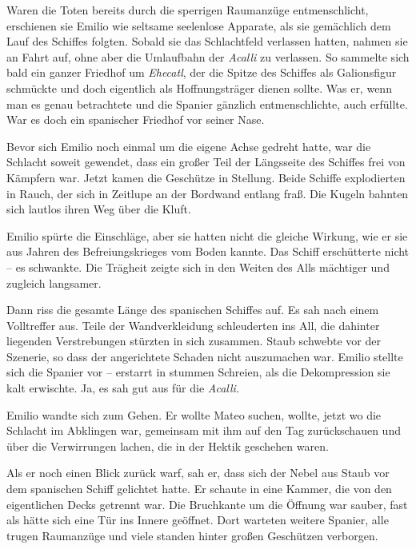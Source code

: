 Waren die Toten bereits durch die sperrigen Raumanzüge
entmenschlicht, erschienen sie Emilio wie seltsame seelenlose
Apparate, als sie gemächlich dem Lauf des Schiffes folgten. Sobald
sie das Schlachtfeld verlassen hatten, nahmen sie an Fahrt auf,
ohne aber die Umlaufbahn der \textit{Acalli} zu verlassen. So sammelte sich
bald ein ganzer Friedhof um \textit{Ehecatl}, der die Spitze des Schiffes
als Galionsfigur schmückte und doch eigentlich als Hoffnungsträger
dienen sollte. Was er, wenn man es genau betrachtete und die
Spanier gänzlich entmenschlichte, auch erfüllte. War es doch ein
spanischer Friedhof vor seiner Nase.

\bigpar

Bevor sich Emilio noch einmal um die eigene Achse gedreht hatte,
war die Schlacht soweit gewendet, dass ein großer Teil der
Längsseite des Schiffes frei von Kämpfern war. Jetzt kamen die
Geschütze in Stellung. Beide Schiffe explodierten in Rauch, der
sich in Zeitlupe an der Bordwand entlang fraß. Die Kugeln bahnten
sich lautlos ihren Weg über die Kluft.

Emilio spürte die Einschläge, aber sie hatten nicht die gleiche
Wirkung, wie er sie aus Jahren des Befreiungskrieges vom Boden
kannte. Das Schiff erschütterte nicht – es schwankte. Die Trägheit
zeigte sich in den Weiten des Alls mächtiger und zugleich
langsamer.

Dann riss die gesamte Länge des spanischen Schiffes auf. Es sah
nach einem Volltreffer aus. Teile der Wandverkleidung schleuderten
ins All, die dahinter liegenden Verstrebungen stürzten in sich
zusammen. Staub schwebte vor der Szenerie, so dass der angerichtete
Schaden nicht auszumachen war. Emilio stellte sich die Spanier vor
– erstarrt in stummen Schreien, als die Dekompression sie kalt
erwischte. Ja, es sah gut aus für die \textit{Acalli}.

\bigpar

Emilio wandte sich zum Gehen. Er wollte Mateo suchen, wollte, jetzt
wo die Schlacht im Abklingen war, gemeinsam mit ihm auf den Tag
zurückschauen und über die Verwirrungen lachen, die in der Hektik
geschehen waren.

Als er noch einen Blick zurück warf, sah er, dass sich der Nebel
aus Staub vor dem spanischen Schiff gelichtet hatte. Er schaute in
eine Kammer, die von den eigentlichen Decks getrennt war. Die
Bruchkante um die Öffnung war sauber, fast als hätte sich eine Tür
ins Innere geöffnet. Dort warteten weitere Spanier, alle trugen
Raumanzüge und viele standen hinter großen Geschützen verborgen.

